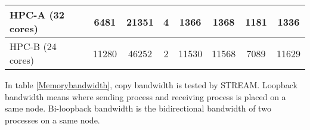 \begin{table*}[]
\begin{tabular}{|l|c|c|c|c|c|c|c|}
HPC-A (32 cores)                                                      & 6481                                                           & 21351                                                          & 4                                                                          & 1366                          & 1368                             & 1181                              & 1336                                \\ \hline
HPC-B (24 cores)                                                      & 11280                                                          & 46252                                                          & 2                                                                          & 11530                         & 11568                            & 7089                              & 11629                               \\ \hline
\end{tabular}
\end{table*}
In table \ref{Memorybandwidth}, copy bandwidth is tested by STREAM. Loopback bandwidth means where sending process and receiving process is placed on a same node. Bi-loopback bandwidth is the bidirectional bandwidth of two processes on a same node.